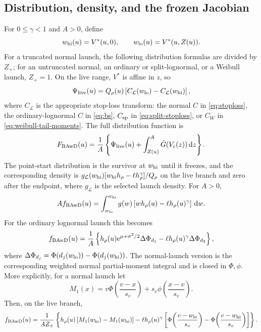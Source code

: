 \documentclass[12pt]{article}
\newcommand{\dd}{\,\mathrm{d}}
\newcommand{\PhiN}{\Phi}
\newcommand{\phiN}{\phi}
\newcommand{\Gbar}{\bar{G}}
\newcommand{\e}{\mathrm{e}}
\theoremstyle{remark}
\begin{document}
\subsection{Distribution, density, and the frozen Jacobian}
For $0\le\gamma<1$ and $A>0$, define
\[
 w_{\rm hi}(u)=V^*(u,0),\qquad w_{\rm lo}(u)=V^*(u,Z(u)).
\]
For a truncated normal launch, the following distribution formulas are divided by $Z_+$; for an untruncated normal, an ordinary or split-lognormal, or a Weibull launch, $Z_+=1$. On the live range, $V^*$ is affine in $z$, so
\begin{equation}
 \Psi_{\rm live}(u)
 =Q_\rho(u)\left[C_{\mathcal L}(w_{\rm lo})-C_{\mathcal L}(w_{\rm hi})\right],
 \label{eq:bawd-live}
\end{equation}
where $C_{\mathcal L}$ is the appropriate stop-loss transform: the normal $C$ in \eqref{eq:stoploss}, the ordinary-lognormal $C$ in \eqref{eq:bs}, $C_{\rm sp}$ in \eqref{eq:split-stoploss}, or $C_W$ in
\eqref{eq:weibull-tail-moments}.
The full distribution function is
\begin{equation}
 F_{\rm BAwD}(u)
 =\frac{1}{A}\left\{\Psi_{\rm live}(u)
 +\int_{Z(u)}^A\Gbar(V_c(z))\dd z\right\}.
 \label{eq:bawd-cdf}
\end{equation}
The point-start distribution is the survivor at $w_{\rm hi}$ until it freezes, and the corresponding density is $g_{\mathcal L}(w_{\rm hi})[w_{\rm hi}h_\rho-\ell h_\rho^\gamma]/Q_\rho$ on the live branch and zero after the endpoint, where $g_{\mathcal L}$ is the selected launch density. For $A>0$,
\begin{equation}
 A f_{\rm BAwD}(u)
 =\int_{w_{\rm lo}}^{w_{\rm hi}}
     g(w)\left[w h_\rho(u)-\ell h_\rho(u)^\gamma\right]\dd w.
 \label{eq:bawd-pdf}
\end{equation}
For the ordinary lognormal launch this becomes
\begin{equation}
 f_{\rm BAwD}(u)
 =\frac{1}{A}\left\{
 h_\rho(u)\e^{\mu+\sigma^2/2}\Delta\PhiN_{d_1}
 -\ell h_\rho(u)^\gamma\Delta\PhiN_{d_2}
 \right\},
 \label{eq:bawd-pdf-logn}
\end{equation}
where $\Delta\PhiN_{d_j}=\PhiN(d_j(w_{\rm lo}))
-\PhiN(d_j(w_{\rm hi}))$. The normal-launch version is the corresponding
weighted normal partial-moment integral and is closed in $\PhiN,\phiN$. More explicitly, for a normal launch let
\[
 M_1(x)=v\PhiN\!\left(\frac{v-x}{s_v}\right)
       +s_v\phiN\!\left(\frac{x-v}{s_v}\right).
\]
Then, on the live branch,
\begin{equation}
 f_{\mathrm{BAwD}}(u)
 =\frac{1}{A Z_+}\left\{
 h_\rho(u)\left[M_1(w_{\rm lo})-M_1(w_{\rm hi})\right]
 -\ell h_\rho(u)^\gamma
   \left[\PhiN\!\left(\frac{v-w_{\rm lo}}{s_v}\right)
        -\PhiN\!\left(\frac{v-w_{\rm hi}}{s_v}\right)\right]
 \right\}.
\label{eq:bawd-pdf-norm}
\end{equation}
\end{document}
